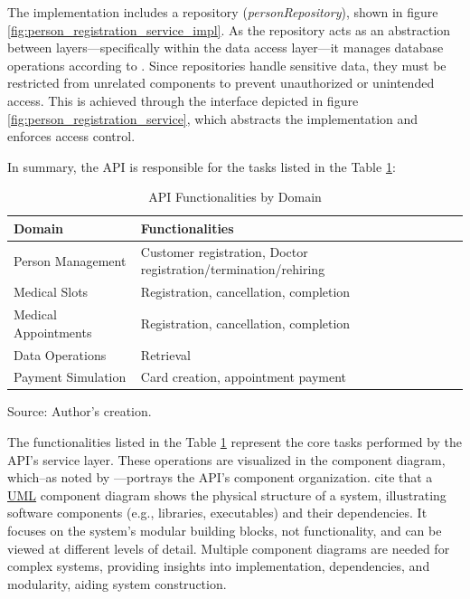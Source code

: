The implementation includes a repository (\textit{personRepository}), shown in figure \ref{fig:person_registration_service_impl}. 
As the repository acts as an abstraction between layers—specifically within the data access layer—it manages database operations according to \cite{prajapati2019asp}. Since repositories handle sensitive data, they must be restricted from unrelated components to prevent unauthorized or 
unintended access. This is achieved through the interface depicted in figure \ref{fig:person_registration_service}, which abstracts the implementation and enforces access control.

In summary, the API is responsible for the tasks listed in the Table \ref{api_functionalities_grouped}:

\begin{table}[H]
\centering
\caption{API Functionalities by Domain}
\label{api_functionalities_grouped}
\begin{tabular}{p{}p{}}
\toprule
\textbf{Domain} & \textbf{Functionalities} \\
\midrule
Person Management & Customer registration, Doctor registration/termination/rehiring \\ \hline
Medical Slots & Registration, cancellation, completion \\ \hline
Medical Appointments & Registration, cancellation, completion \\ \hline
Data Operations & Retrieval \\ \hline
Payment Simulation & Card creation, appointment payment \\
\bottomrule
\end{tabular}
\footnotesize Source: Author's creation.
\end{table}

The functionalities listed in the Table 
\ref{api_functionalities_grouped} represent the core tasks performed by the API's service layer. These operations are visualized in the component diagram, which--as noted by \cite{rajagopal2017study}—portrays the API's component organization. \cite{bell2003uml, rajput2015uml} cite that a \hyperref[appendix:glossary]{UML} component diagram shows the physical structure of a system, illustrating software components (e.g., libraries, executables) and their dependencies. It focuses on the system's modular building blocks, not functionality, and can be viewed at different levels of detail. Multiple component diagrams are needed for complex systems, providing insights into implementation, dependencies, and modularity, aiding system construction.

